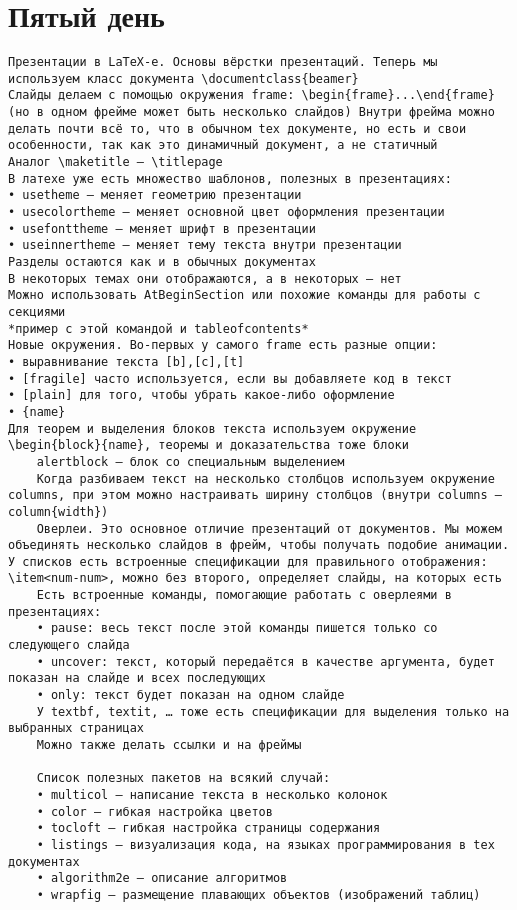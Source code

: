 \documentclass[a4paper, 12pt]{article}
\begin{document}
\section{Пятый день}
\begin{verbatim}
Презентации в LaTeX-е. Основы вёрстки презентаций. Теперь мы используем класс документа \documentclass{beamer}
Слайды делаем с помощью окружения frame: \begin{frame}...\end{frame}(но в одном фрейме может быть несколько слайдов) Внутри фрейма можно делать почти всё то, что в обычном tex документе, но есть и свои особенности, так как это динамичный документ, а не статичный
Аналог \maketitle – \titlepage
В латехе уже есть множество шаблонов, полезных в презентациях:
• usetheme – меняет геометрию презентации
• usecolortheme – меняет основной цвет оформления презентации
• usefonttheme – меняет шрифт в презентации
• useinnertheme – меняет тему текста внутри презентации
Разделы остаются как и в обычных документах
В некоторых темах они отображаются, а в некоторых – нет
Можно использовать AtBeginSection или похожие команды для работы с секциями
*пример с этой командой и tableofcontents*
Новые окружения. Во-первых у самого frame есть разные опции:
• выравнивание текста [b],[c],[t]
• [fragile] часто используется, если вы добавляете код в текст
• [plain] для того, чтобы убрать какое-либо оформление
• {name}
Для теорем и выделения блоков текста используем окружение \begin{block}{name}, теоремы и доказательства тоже блоки
	alertblock – блок со специальным выделением
	Когда разбиваем текст на несколько столбцов используем окружение columns, при этом можно настраивать ширину столбцов (внутри columns – column{width})
	Оверлеи. Это основное отличие презентаций от документов. Мы можем объединять несколько слайдов в фрейм, чтобы получать подобие анимации. У списков есть встроенные спецификации для правильного отображения: \item<num-num>, можно без второго, определяет слайды, на которых есть
	Есть встроенные команды, помогающие работать с оверлеями в презентациях:
	• pause: весь текст после этой команды пишется только со следующего слайда
	• uncover: текст, который передаётся в качестве аргумента, будет показан на слайде и всех последующих
	• only: текст будет показан на одном слайде
	У textbf, textit, … тоже есть спецификации для выделения только на выбранных страницах
	Можно также делать ссылки и на фреймы
	
	Список полезных пакетов на всякий случай:
	• multicol – написание текста в несколько колонок
	• color – гибкая настройка цветов
	• tocloft – гибкая настройка страницы содержания
	• listings – визуализация кода, на языках программирования в tex документах
	• algorithm2e – описание алгоритмов
	• wrapfig – размещение плавающих объектов (изображений таблиц)
\end{verbatim}
\end{document}
